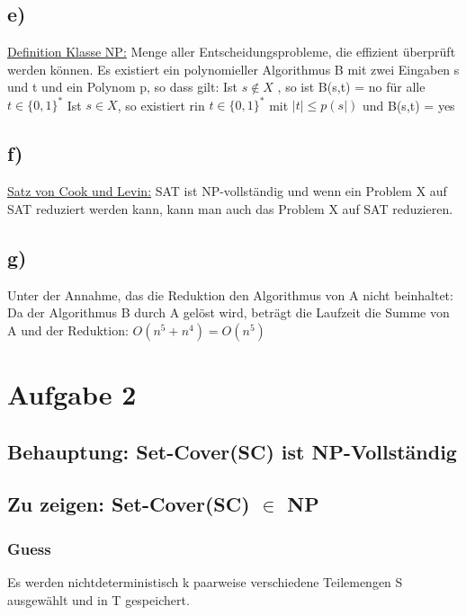 \documentclass[a4paper,11pt,twoside]{article}
\begin{document}
\subsection*{e)}
\underline{Definition Klasse NP:} Menge aller Entscheidungsprobleme, die effizient überprüft werden können.
\newline
Es existiert ein polynomieller Algorithmus B mit zwei Eingaben s und t und ein Polynom p, so dass gilt:
\newline Ist $ s \notin X $ , so ist B(s,t) = no für alle $ t \in \{0,1\}^* $
\newline Ist $ s \in X $, so existiert rin $ t \in \{0,1\}^* $ mit $ |t| \leq p(s|)$ und B(s,t) = yes
\newline

\subsection*{f)}
\underline{Satz von Cook und Levin:} SAT ist NP-vollständig und wenn ein Problem X auf SAT reduziert werden kann, kann man auch das Problem X auf SAT reduzieren.
\newline

\subsection*{g)}
Unter der Annahme, das die Reduktion den Algorithmus von A nicht beinhaltet:\\
Da der Algorithmus B durch A gelöst wird, beträgt die Laufzeit die Summe von A und der Reduktion: $ O(n^5+n^4) = O(n^5) $ 

\section*{Aufgabe 2}
\subsection*{Behauptung: Set-Cover(SC) ist NP-Vollständig}
\subsection*{Zu zeigen: Set-Cover(SC) $\in$ NP}
\subsubsection*{Guess}
Es werden nichtdeterministisch k paarweise verschiedene Teilemengen S ausgewählt und in T gespeichert.
\end{document}
